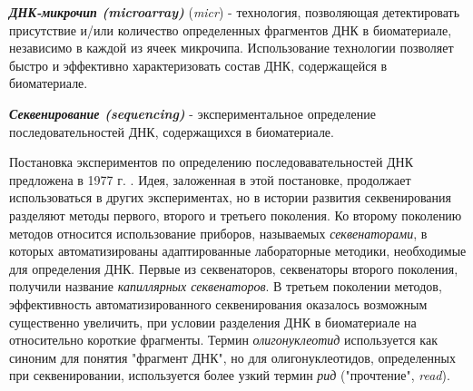 \noindent
\textbf{ \textit{ДНК-микрочип (microarray)} } (\textit{micr}) - технология, позволяющая детектировать присутствие и/или количество определенных фрагментов ДНК в биоматериале, независимо в каждой из ячеек микрочипа. Использование технологии позволяет быстро и эффективно характеризовать состав ДНК, содержащейся в биоматериале.



\noindent
\textbf{ \textit{Секвенирование (sequencing)} } - экспериментальное определение последовательностей ДНК, содержащихся в биоматериале.

Постановка экспериментов по определению последовавательностей ДНК предложена в 1977 г. \parencite{Sanger_1977}. Идея, заложенная в этой постановке, продолжает использоваться в других экспериментах, но в истории развития секвенирования разделяют методы первого, второго и третьего поколения. Ко второму поколению методов относится использование приборов, называемых \textit{секвенаторами}, в которых автоматизированы адаптированные лабораторные методики, необходимые для определения ДНК. Первые из секвенаторов, секвенаторы второго поколения, получили название \textit{капиллярных секвенаторов}. В третьем поколении методов, эффективность автоматизированного секвенирования оказалось возможным существенно увеличить, при условии разделения ДНК в биоматериале на относительно короткие фрагменты. Термин \textit{олигонуклеотид} используется как синоним для понятия "фрагмент ДНК", но для олигонуклеотидов, определенных при секвенировании, используется более узкий термин \textit{рид} ("прочтение", \textit{read}).  

